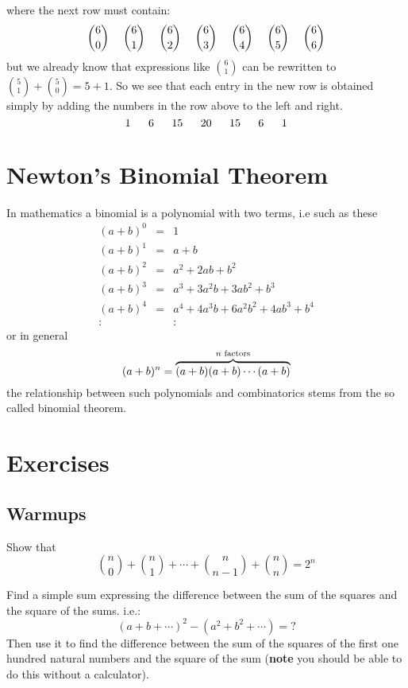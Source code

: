 where the next row must contain:
\[
\binom{6}{0} \hspace{0.45cm} \binom{6}{1} \hspace{0.45cm} \binom{6}{2} \hspace{0.45cm} \binom{6}{3} \hspace{0.45cm} \binom{6}{4} \hspace{0.45cm} \binom{6}{5} \hspace{0.45cm} \binom{6}{6} 
\]
but we already know that expressions like $\binom{6}{1}$ can be rewritten to $\binom{5}{1} + \binom{5}{0} = 5 + 1$. So we see that each entry in the new 
row is obtained simply by adding the numbers in the row above to the left and right.
\[
1\ \myindent 6\ \myindent 15\ \myindent 20\ \myindent 15\ \myindent 6\ \myindent 1
\]

\newpage
\section{Newton's Binomial Theorem}
In mathematics a binomial is a polynomial with two terms, i.e such as these
\[\begin{array}{lcl} 
(a + b)^0 &=& 1\\
(a + b)^1 &=& a + b \\
(a + b)^2 &=& a^2 + 2ab + b^2 \\
(a + b)^3 &=& a^3 + 3a^2b + 3ab^2 + b^3 \\
(a + b)^4 &=& a^4 + 4a^3b + 6a^2b^2 + 4ab^3 + b^4 \\
:                &   & :
\end{array}\]
or in general 
\[
(a+b)^n = \overbrace{(a+b)(a+b)\cdots(a+b)}^{n\textnormal{ factors}}
\]
the relationship between such polynomials and combinatorics stems from the so called binomial theorem.  


\newpage
\section*{Exercises}
\subsection*{Warmups}
\begin{exc}\label{ex:analysis:1}
Show that 
\[
\binom{n}{0} + \binom{n}{1} + \cdots + \binom{n}{n - 1} + \binom{n}{n} = 2^n
\]
\end{exc}
\begin{exc}\label{ex:analysis:2}
Find a simple sum expressing the difference between the sum of the squares and the square of the sums. i.e.:
\[
(a + b + \cdots)^2 - (a^2 + b^2 + \cdots) = ?
\]
Then use it to find the difference between the sum of the squares of the first one hundred natural numbers and the
square of the sum (\textbf{note} you should be able to do this without a calculator). 
\end{exc}

